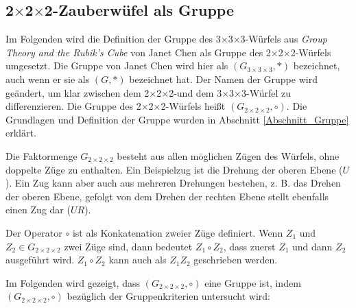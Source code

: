 \documentclass[12pt,a4paper, usenames, dvipsnames]{article}
\theoremstyle{mystyle}
\theoremstyle{definition}
\newcommand{\Gtwo}{\ensuremath{G_{2\times 2\times 2}}}
\newcommand{\Gthree}{\ensuremath{G_{3\times 3\times 3}}}
\newcommand{\Ttwo}{2$\times$2$\times$2-}
\newcommand{\Tthree}{3$\times$3$\times$3-}
\begin{document}
%
%
%
%
%
%
%
%
%
%
%
%
%
%
%
%
%
%
%

\subsection{\Ttwo Zauberwüfel als Gruppe} 
 \label{Abschnitt_WürfelAlsGruppe}

Im Folgenden wird die Definition der Gruppe des \Tthree Würfels aus \textit{Group Theory and the Rubik's Cube}  von Janet Chen \cite{JC} als Gruppe des \Ttwo Würfels umgesetzt. Die Gruppe von Janet Chen wird hier als $(\Gthree, *)$ bezeichnet, auch wenn er sie als $(G, *)$ bezeichnet hat. Der Namen der Gruppe wird geändert, um klar zwischen dem \Ttwo  und dem \Tthree Würfel zu differenzieren. Die Gruppe des \Ttwo Würfels heißt $(\Gtwo, \circ)$. 
Die Grundlagen und Definition der Gruppe wurden in Abschnitt \ref{Abschnitt_Gruppe} erklärt.


Die Faktormenge $\Gtwo$ besteht aus allen möglichen Zügen des Würfels, ohne doppelte Züge zu enthalten. Ein Beispielzug ist die Drehung der oberen Ebene ($U$). Ein Zug kann aber auch aus mehreren Drehungen bestehen, z. B. das Drehen der oberen Ebene, gefolgt von dem Drehen der rechten Ebene stellt ebenfalls einen Zug dar ($UR$). 


Der Operator $\circ$ ist als Konkatenation zweier Züge definiert. Wenn $Z_1$ und $Z_2 \in \Gtwo$ zwei Züge sind, dann bedeutet $Z_1 \circ Z_2$, dass zuerst $Z_1$ und dann $Z_2$ ausgeführt wird. $Z_1 \circ Z_2$ kann auch als $Z_1Z_2$ geschrieben werden.

Im Folgenden wird gezeigt, dass $(\Gtwo, \circ)$ eine Gruppe ist, indem $(\Gtwo, \circ)$ bezüglich der Gruppenkriterien untersucht wird:
\end{document}
